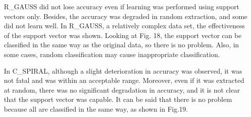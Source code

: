 R\_GAUSS did not lose accuracy even if learning was performed using support vectors only. Besides, the accuracy was degraded in random extraction, and some did not learn well. In R\_GAUSS, a relatively complex data set, the effectiveness of the support vector was shown. Looking at Fig. 18, the support vector can be classified in the same way as the original data, so there is no problem. Also, in some cases, random classification may cause inappropriate classification.

In C\_SPIRAL, although a slight deterioration in accuracy was observed, it was not fatal and was within an acceptable range. Moreover, even if it was extracted at random, there was no significant degradation in accuracy, and it is not clear that the support vector was capable. It can be said that there is no problem because all are classified in the same way, as shown in Fig.19.
